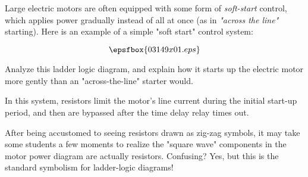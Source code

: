 

Large electric motors are often equipped with some form of {\it soft-start} control, which applies power gradually instead of all at once (as in {\it "across the line"} starting).  Here is an example of a simple "soft start" control system:

$$\epsfbox{03149x01.eps}$$

Analyze this ladder logic diagram, and explain how it starts up the electric motor more gently than an "across-the-line" starter would.







In this system, resistors limit the motor's line current during the initial start-up period, and then are bypassed after the time delay relay times out.







After being accustomed to seeing resistors drawn as zig-zag symbols, it may take some students a few moments to realize the "square wave" components in the motor power diagram are actually resistors.  Confusing?  Yes, but this is the standard symbolism for ladder-logic diagrams!




